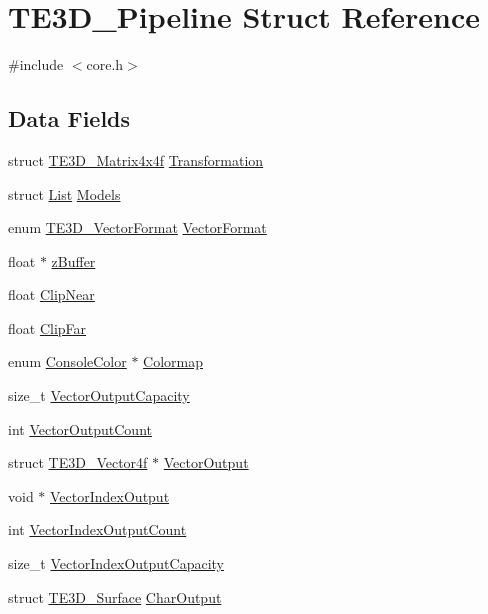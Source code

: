 \hypertarget{struct_t_e3_d___pipeline}{\section{T\-E3\-D\-\_\-\-Pipeline Struct Reference}
\label{struct_t_e3_d___pipeline}
}


{\ttfamily \#include $<$core.\-h$>$}

\subsection*{Data Fields}
\begin{DoxyCompactItemize}
\item 
struct \hyperlink{struct_t_e3_d___matrix4x4f}{T\-E3\-D\-\_\-\-Matrix4x4f} \hyperlink{struct_t_e3_d___pipeline_a18ddbbc6401acb6e43259850e1e581ef}{Transformation}
\item 
struct \hyperlink{struct_list}{List} \hyperlink{struct_t_e3_d___pipeline_a83a7e2814c3565a16a3f99d0fe61d130}{Models}
\item 
enum \hyperlink{models_8h_a68e3f605ef2dc9e35776b9c37f15495a}{T\-E3\-D\-\_\-\-Vector\-Format} \hyperlink{struct_t_e3_d___pipeline_a422631c708e3e0e6bb3bf305e9914418}{Vector\-Format}
\item 
float $\ast$ \hyperlink{struct_t_e3_d___pipeline_a627615edd455b5791a70b97c531d8942}{z\-Buffer}
\item 
float \hyperlink{struct_t_e3_d___pipeline_a03426847bd37f9f0b28bc8da33d4db9d}{Clip\-Near}
\item 
float \hyperlink{struct_t_e3_d___pipeline_a5b41707833d27e2aff056a7ed6a0cb70}{Clip\-Far}
\item 
enum \hyperlink{console_8h_a821042d5f30537f776ce823c5d66aada}{Console\-Color} $\ast$ \hyperlink{struct_t_e3_d___pipeline_a5a84db4451cdf0fbed35c8951455ac20}{Colormap}
\item 
size\-\_\-t \hyperlink{struct_t_e3_d___pipeline_a6372ef48448fcdf753e0ae30212feef6}{Vector\-Output\-Capacity}
\item 
int \hyperlink{struct_t_e3_d___pipeline_ae10862edd986d72d19291e85965282f6}{Vector\-Output\-Count}
\item 
struct \hyperlink{struct_t_e3_d___vector4f}{T\-E3\-D\-\_\-\-Vector4f} $\ast$ \hyperlink{struct_t_e3_d___pipeline_a484b514c3272f2ebd29fadb67c976cfb}{Vector\-Output}
\item 
void $\ast$ \hyperlink{struct_t_e3_d___pipeline_ad8118d66dd301ae8c3c169705afc0096}{Vector\-Index\-Output}
\item 
int \hyperlink{struct_t_e3_d___pipeline_a26aaade63f941ff5fe6d8b310dc74c7f}{Vector\-Index\-Output\-Count}
\item 
size\-\_\-t \hyperlink{struct_t_e3_d___pipeline_affb87c7664521d942273fcc22a2b715f}{Vector\-Index\-Output\-Capacity}
\item 
struct \hyperlink{struct_t_e3_d___surface}{T\-E3\-D\-\_\-\-Surface} \hyperlink{struct_t_e3_d___pipeline_a4ccfa7cf1426da85d6f78d608c904ba4}{Char\-Output}
\end{DoxyCompactItemize}


